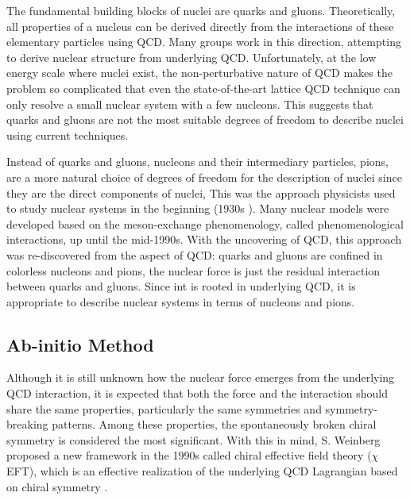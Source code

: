 The fundamental building blocks of nuclei are quarks and gluons. Theoretically, 
all properties of a nucleus can be derived directly from the interactions
of these elementary particles using QCD. Many groups work in this direction, 
attempting to derive nuclear structure from underlying QCD. 
Unfortunately, at the low energy scale where nuclei exist, the non-perturbative nature of 
QCD makes the problem so complicated that even the state-of-the-art lattice QCD
technique can only resolve a small nuclear system with a few nucleons.
This suggests that quarks and gluons are not the most suitable degrees of freedom to describe nuclei
using current techniques.

Instead of quarks and gluons, nucleons and their intermediary particles, pions,
are a more natural choice of degrees of freedom for the description of nuclei
since they are the direct components of nuclei, 
This was the approach physicists used to study nuclear systems in the beginning (1930s \cite{10.1143/PTPS.1.1}). 
Many nuclear models were developed based on the meson-exchange phenomenology, called	%
phenomenological interactions, up until the mid-1990s.
With the uncovering of QCD, this approach was re-discovered from the aspect of QCD:
quarks and gluons are confined in colorless nucleons and pions, the nuclear force
is just the residual interaction between quarks and gluons. Since int is rooted 
in underlying QCD, it is appropriate to describe nuclear systems in terms of nucleons and pions.

\subsection{Ab-initio Method}
Although it is still unknown how the nuclear force emerges from the underlying QCD interaction,
it is expected that both the force and the interaction should share the same properties, 
particularly the same symmetries and symmetry-breaking patterns. 
Among these properties, the spontaneously broken chiral symmetry is considered 
the most significant. With this in mind, S. Weinberg proposed a new framework
in the 1990s called chiral effective field theory ($\chi$EFT), which is an effective realization of the 
underlying QCD Lagrangian based on chiral symmetry \cite{WEINBERG1979327}.



